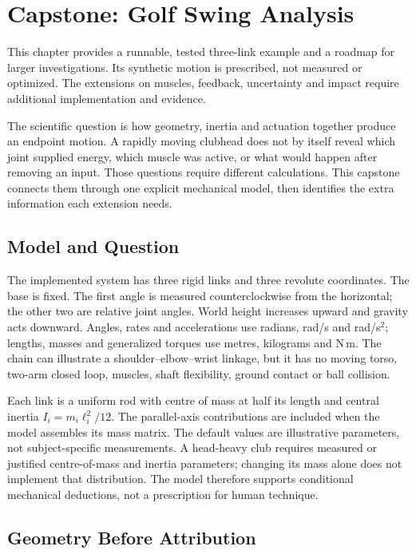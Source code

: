 \chapter{Capstone: Golf Swing Analysis}
\label{ch:golf-capstone}

\begin{gomdraftnotice}
This chapter provides a runnable, tested three-link example and a roadmap for
larger investigations. Its synthetic motion is prescribed, not measured or
optimized. The extensions on muscles, feedback, uncertainty and impact require
additional implementation and evidence.
\end{gomdraftnotice}

The scientific question is how geometry, inertia and actuation together produce
an endpoint motion. A rapidly moving clubhead does not by itself reveal which
joint supplied energy, which muscle was active, or what would happen after
removing an input. Those questions require different calculations. This capstone
connects them through one explicit mechanical model, then identifies the extra
information each extension needs.

\section{Model and Question}

The implemented system has three rigid links and three revolute coordinates.
The base is fixed. The first angle is measured counterclockwise from the
horizontal; the other two are relative joint angles. World height increases
upward and gravity acts downward. Angles, rates and accelerations use radians,
rad/s and rad/s$^2$; lengths, masses and generalized torques use metres,
kilograms and N\,m. The chain can illustrate a shoulder--elbow--wrist linkage,
but it has no moving torso, two-arm closed loop, muscles, shaft flexibility,
ground contact or ball collision.

Each link is a uniform rod with centre of mass at half its length and central
inertia $I_i=m_i\ell_i^2/12$. The parallel-axis contributions are included when
the model assembles its mass matrix. The default values are illustrative
parameters, not subject-specific measurements. A head-heavy club requires
measured or justified centre-of-mass and inertia parameters; changing its mass
alone does not implement that distribution. The model therefore supports
conditional mechanical deductions, not a prescription for human technique.

\section{Geometry Before Attribution}


